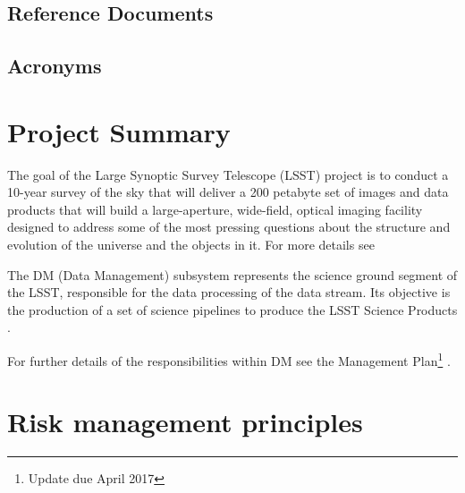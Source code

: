 \documentclass[DM,lsstdraft,PL]{lsstdoc}
\begin{document}
\subsection{Reference Documents\label{sect:references}}

\renewcommand{\refname}{}



\newpage
\subsection{Acronyms}

\newpage

\section{Project Summary \label{sect:project}}

The goal of the Large Synoptic Survey Telescope (LSST) project is to conduct a 10-year survey of the sky that will deliver a 200 petabyte set of images and data products that will build a large-aperture, wide-field, optical imaging facility designed to address some of the most pressing questions about the structure and evolution of the universe and the objects in it.  For more details see 

The DM (Data Management) subsystem represents the science ground segment of the LSST, responsible for the data processing of the data stream. Its objective is the production of a set of science pipelines to produce the LSST Science Products . 

For further details of the responsibilities within DM see the Management Plan\footnote{Update due April 2017} .


\newpage

\section{Risk management principles \label{sect:principles}}
\end{document}
